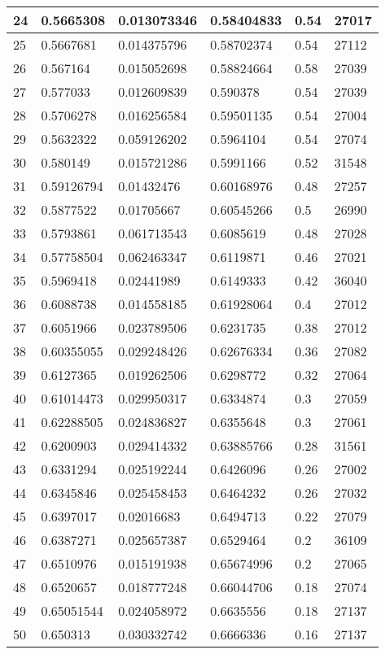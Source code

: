 \begin{longtable}{|l|l|l|l|l|l|}
24 & 0.5665308 & 0.013073346 & 0.58404833 & 0.54 & 27017 \\ \hline 
25 & 0.5667681 & 0.014375796 & 0.58702374 & 0.54 & 27112 \\ \hline 
26 & 0.567164 & 0.015052698 & 0.58824664 & 0.58 & 27039 \\ \hline 
27 & 0.577033 & 0.012609839 & 0.590378 & 0.54 & 27039 \\ \hline 
28 & 0.5706278 & 0.016256584 & 0.59501135 & 0.54 & 27004 \\ \hline 
29 & 0.5632322 & 0.059126202 & 0.5964104 & 0.54 & 27074 \\ \hline 
30 & 0.580149 & 0.015721286 & 0.5991166 & 0.52 & 31548 \\ \hline 
31 & 0.59126794 & 0.01432476 & 0.60168976 & 0.48 & 27257 \\ \hline 
32 & 0.5877522 & 0.01705667 & 0.60545266 & 0.5 & 26990 \\ \hline 
33 & 0.5793861 & 0.061713543 & 0.6085619 & 0.48 & 27028 \\ \hline 
34 & 0.57758504 & 0.062463347 & 0.6119871 & 0.46 & 27021 \\ \hline 
35 & 0.5969418 & 0.02441989 & 0.6149333 & 0.42 & 36040 \\ \hline 
36 & 0.6088738 & 0.014558185 & 0.61928064 & 0.4 & 27012 \\ \hline 
37 & 0.6051966 & 0.023789506 & 0.6231735 & 0.38 & 27012 \\ \hline 
38 & 0.60355055 & 0.029248426 & 0.62676334 & 0.36 & 27082 \\ \hline 
39 & 0.6127365 & 0.019262506 & 0.6298772 & 0.32 & 27064 \\ \hline 
40 & 0.61014473 & 0.029950317 & 0.6334874 & 0.3 & 27059 \\ \hline 
41 & 0.62288505 & 0.024836827 & 0.6355648 & 0.3 & 27061 \\ \hline 
42 & 0.6200903 & 0.029414332 & 0.63885766 & 0.28 & 31561 \\ \hline 
43 & 0.6331294 & 0.025192244 & 0.6426096 & 0.26 & 27002 \\ \hline 
44 & 0.6345846 & 0.025458453 & 0.6464232 & 0.26 & 27032 \\ \hline 
45 & 0.6397017 & 0.02016683 & 0.6494713 & 0.22 & 27079 \\ \hline 
46 & 0.6387271 & 0.025657387 & 0.6529464 & 0.2 & 36109 \\ \hline 
47 & 0.6510976 & 0.015191938 & 0.65674996 & 0.2 & 27065 \\ \hline 
48 & 0.6520657 & 0.018777248 & 0.66044706 & 0.18 & 27074 \\ \hline 
49 & 0.65051544 & 0.024058972 & 0.6635556 & 0.18 & 27137 \\ \hline 
50 & 0.650313 & 0.030332742 & 0.6666336 & 0.16 & 27137 \\ \hline 
\end{longtable}